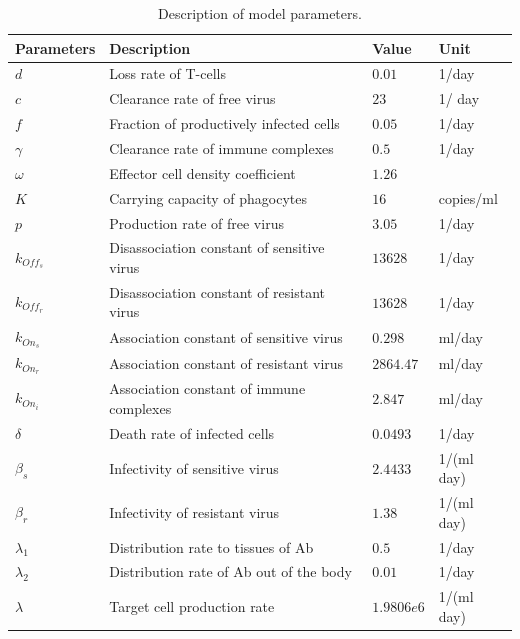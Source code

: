 \documentclass[fleqn,10pt]{wlscirep}
\begin{document}
\begin{table}[ht]
\centering
\begin{tabular}{|l|l|l|l|}
\hline
\textbf{Parameters} & \textbf{Description} & \textbf{Value} & \textbf{Unit} \\
\hline
$d$ & Loss rate of T-cells & $0.01$ & 1/day \\
\hline
$c$ & Clearance rate of free virus & $23$ & 1/ day  \\
\hline
$f$ & Fraction of productively infected cells & $0.05$ & 1/day \\
\hline
$\gamma$ & Clearance rate of immune complexes & $0.5$ & 1/day  \\
\hline
$\omega$ & Effector cell density coefficient & $1.26$ & \\
\hline
$K$ & Carrying capacity of phagocytes & $16$ & copies/ml \\
\hline
$p$ & Production rate of free virus & $3.05$ & 1/day \\
\hline
$k_{Off_s}$ & Disassociation constant of sensitive virus & $13628$ & 1/day \\
\hline
$k_{Off_r}$ & Disassociation constant of resistant virus & $13628$ & 1/day \\
\hline
$k_{On_s}$ & Association constant of sensitive virus & $0.298$ & ml/day \\
\hline
$k_{On_r}$ & Association constant of resistant virus & $2864.47$ & ml/day \\
\hline
$k_{On_i}$ & Association constant of immune complexes & $2.847$ & ml/day \\
\hline
$\delta$ & Death rate of infected cells & $0.0493$ & 1/day \\
\hline
$\beta_s$ & Infectivity of sensitive virus & $2.4433$ & 1/(ml day) \\
\hline
$\beta_r$ & Infectivity of resistant virus & $1.38$ & 1/(ml day) \\
\hline
$\lambda_1$ & Distribution rate to tissues of Ab & $0.5$ & 1/day \\
\hline
$\lambda_2$ & Distribution rate of Ab out of the body & $0.01$ & 1/day \\
\hline
$\lambda$ & Target cell production rate & $1.9806 e6$ & 1/(ml day) \\
\hline
\end{tabular}
\caption{\label{tab:par}Description of model parameters.}
\end{table}
\end{document}
